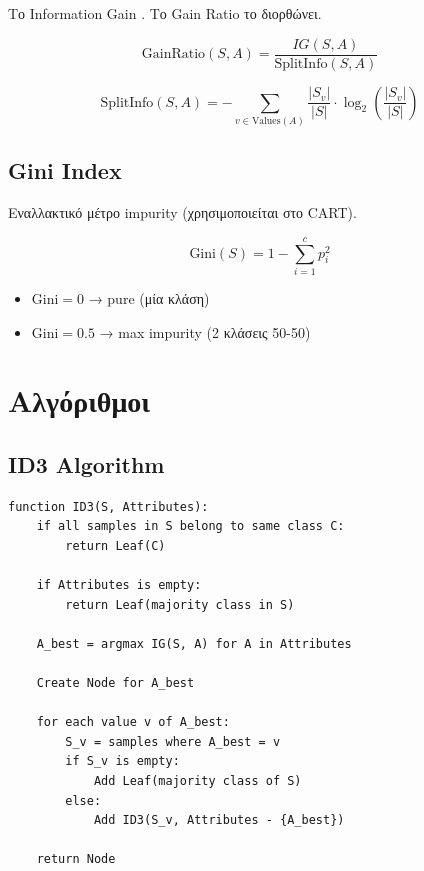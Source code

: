 Το Information Gain . Το Gain Ratio το διορθώνει.

\begin{formulabox}
\begin{equation}
\text{GainRatio}(S, A) = \frac{IG(S, A)}{\text{SplitInfo}(S, A)}
\end{equation}

\begin{equation}
\text{SplitInfo}(S, A) = -\sum_{v \in \text{Values}(A)} \frac{|S_v|}{|S|} \cdot \log_2\left(\frac{|S_v|}{|S|}\right)
\end{equation}
\end{formulabox}

\subsection{Gini Index}

Εναλλακτικό μέτρο impurity (χρησιμοποιείται στο CART).

\begin{formulabox}
\begin{equation}
\text{Gini}(S) = 1 - \sum_{i=1}^{c} p_i^2
\end{equation}

\begin{itemize}
    \item $\text{Gini} = 0$ → pure (μία κλάση)
    \item $\text{Gini} = 0.5$ → max impurity (2 κλάσεις 50-50)
\end{itemize}
\end{formulabox}

\section{Αλγόριθμοι}

\subsection{ID3 Algorithm}

\begin{algorithmbox}
\begin{lstlisting}[language=pseudo]
function ID3(S, Attributes):
    if all samples in S belong to same class C:
        return Leaf(C)

    if Attributes is empty:
        return Leaf(majority class in S)

    A_best = argmax IG(S, A) for A in Attributes

    Create Node for A_best

    for each value v of A_best:
        S_v = samples where A_best = v
        if S_v is empty:
            Add Leaf(majority class of S)
        else:
            Add ID3(S_v, Attributes - {A_best})

    return Node
\end{lstlisting}
\end{algorithmbox}

